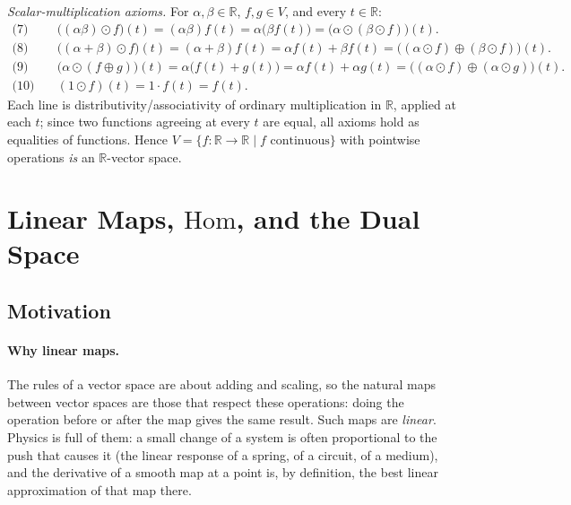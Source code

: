 \documentclass[11pt]{article}
\begin{document}
\emph{Scalar-multiplication axioms.} For $\alpha,\beta\in\mathbb R$, $f,g\in V$, and every $t\in\mathbb R$:
\begin{align*}
\text{(7)}\quad & \big((\alpha\beta)\odot f\big)(t) = (\alpha\beta)f(t) = \alpha\big(\beta f(t)\big) = \big(\alpha\odot(\beta\odot f)\big)(t). \\
\text{(8)}\quad & \big((\alpha+\beta)\odot f\big)(t) = (\alpha+\beta)f(t) = \alpha f(t)+\beta f(t) = \big((\alpha\odot f)\oplus(\beta\odot f)\big)(t). \\
\text{(9)}\quad & \big(\alpha\odot(f\oplus g)\big)(t) = \alpha\big(f(t)+g(t)\big) = \alpha f(t)+\alpha g(t) = \big((\alpha\odot f)\oplus(\alpha\odot g)\big)(t). \\
\text{(10)}\quad & (1\odot f)(t) = 1\cdot f(t) = f(t).
\end{align*}
Each line is distributivity/associativity of ordinary multiplication in $\mathbb R$, applied at each $t$; since two functions agreeing at every $t$ are equal, all axioms hold as equalities of functions. Hence $V=\{f:\mathbb R\to\mathbb R \mid f \text{ continuous}\}$ with pointwise operations \emph{is} an $\mathbb{R}$-vector space.

\section{Linear Maps, $\mathrm{Hom}$, and the Dual Space}

\subsection*{Motivation}

\paragraph{Why linear maps.}
The rules of a vector space are about adding and scaling, so the natural maps between vector spaces are those that respect these operations: doing the operation before or after the map gives the same result. Such maps are \emph{linear}. Physics is full of them: a small change of a system is often proportional to the push that causes it (the linear response of a spring, of a circuit, of a medium), and the derivative of a smooth map at a point is, by definition, the best linear approximation of that map there.
\end{document}
